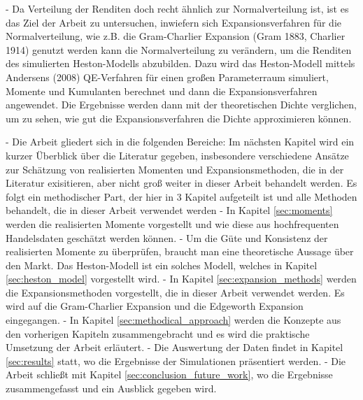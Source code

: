 - Da Verteilung der Renditen doch recht ähnlich zur Normalverteilung ist, ist es das Ziel der Arbeit zu untersuchen, inwiefern sich Expansionsverfahren für die Normalverteilung, wie z.B. die Gram-Charlier Expansion (Gram 1883, Charlier 1914) genutzt werden kann die Normalverteilung zu verändern, um die Renditen des simulierten Heston-Modells abzubilden. Dazu wird das Heston-Modell mittels Andersens (2008) QE-Verfahren für einen großen Parameterraum simuliert, Momente und Kumulanten berechnet und dann die Expansionsverfahren angewendet. Die Ergebnisse werden dann mit der theoretischen Dichte verglichen, um zu sehen, wie gut die Expansionsverfahren die Dichte approximieren können.

- Die Arbeit gliedert sich in die folgenden Bereiche: Im nächsten Kapitel wird ein kurzer Überblick über die Literatur gegeben, insbesondere verschiedene Ansätze zur Schätzung von realisierten Momenten und Expansionsmethoden, die in der Literatur exisitieren, aber nicht groß weiter in dieser Arbeit behandelt werden. Es folgt ein methodischer Part, der hier in 3 Kapitel aufgeteilt ist und alle Methoden behandelt, die in dieser Arbeit verwendet werden
- In Kapitel \ref{sec:moments} werden die realisierten Momente vorgestellt und wie diese aus hochfrequenten Handelsdaten geschätzt werden können.
- Um die Güte und Konsistenz der realisierten Momente zu überprüfen, braucht man eine theoretische Aussage über den Markt. Das Heston-Modell ist ein solches Modell, welches in Kapitel \ref{sec:heston_model} vorgestellt wird.
- In Kapitel \ref{sec:expansion_methods} werden die Expansionsmethoden vorgestellt, die in dieser Arbeit verwendet werden. Es wird auf die Gram-Charlier Expansion und die Edgeworth Expansion eingegangen.
- In Kapitel \ref{sec:methodical_approach} werden die Konzepte aus den vorherigen Kapiteln zusammengebracht und es wird die praktische Umsetzung der Arbeit erläutert.
- Die Auswertung der Daten findet in Kapitel \ref{sec:results} statt, wo die Ergebnisse der Simulationen präsentiert werden.
- Die Arbeit schließt mit Kapitel \ref{sec:conclusion_future_work}, wo die Ergebnisse zusammengefasst und ein Ausblick gegeben wird.